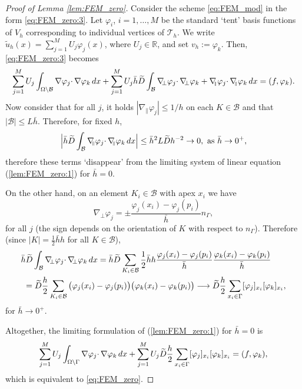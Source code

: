 \documentclass{article}
\theoremstyle{remark}
\def \IR {\mathbb{R}}
\def \Th {{\mathcal T}_h}
\def \d {{\rm d}}
\def\dx{\,\d x }
\def\B{\mathcal{B}}
\def\tu{\tilde{u}}
\def\gradn{\nabla_{\!\!\perp}}
\def\gradt{\nabla_{\!\!{\scriptscriptstyle\parallel}}}
\def\tD{\widetilde{D}}
\def\width{\bar{h}}
\begin{document}
\begin{proof}[Proof of Lemma \ref{lem:FEM_zero}]
Consider the scheme \eqref{eq:FEM_mod} in the form \eqref{eq:FEM_zero:3}. Let $\varphi_i$, $i=1,\ldots,M$ be the standard `tent' basis functions of $V_h$ corresponding to individual vertices of $\Th$. We write $\tu_h(x)=\sum_{j=1}^M U_j\varphi_j(x)$, where $U_j\in \IR$, and set $v_h:=\varphi_k$. Then, \eqref{eq:FEM_zero:3} becomes
\begin{equation}
\label{lem:FEM_zero:1}
\sum_{j=1}^M U_j\int_{\Omega\setminus\B} \nabla \varphi_j\cdotp\nabla \varphi_k \dx +\sum_{j=1}^M U_j\width\tD\int_{\B} \gradn \varphi_j \cdotp\gradn \varphi_k +\gradt \varphi_j\cdotp\gradt \varphi_k \dx=(f,\varphi_k).
\end{equation}
Now consider that for all $j$, it holds $|\gradt \varphi_j|\leq1/h$ on each $K\in\B$ and that $|\B|\leq L\width$. Therefore, for fixed $h$,
\begin{equation*}
\label{lem:FEM_zero:2}
\Big|\width\tD\int_{\B} \gradt \varphi_j\cdotp\gradt \varphi_k \dx\Big| \leq \width^2 L\tD h^{-2} \to 0,\text{ as }\width\to 0^+,
\end{equation*}
therefore these terms `disappear' from the limiting system of linear equation (\ref{lem:FEM_zero:1}) for $\width=0$.

On the other hand, on an element $K_i\in\B$ with apex $x_i$ we have
\begin{equation*}
\gradn \varphi_j=\pm\frac{\varphi_j(x_i)-\varphi_j(p_i)}{\width}n_\Gamma,
\end{equation*}
for all $j$ (the sign depends on the orientation of $K$ with respect to $n_\Gamma$). Therefore (since $|K|=\tfrac{1}{2}\width h$ for all $K\in\B$),
\begin{equation}
\nonumber
\label{lem:FEM_zero:3}
\begin{split}
&\width\tD\int_{\B} \gradn \varphi_j \cdotp\gradn \varphi_k \dx= \width\tD\sum_{K_i\in\B}\frac{1}{2}\width h \frac{\varphi_j(x_i)-\varphi_j(p_i)}{\width}
\frac{\varphi_k(x_i)-\varphi_k(p_i)}{\width}\\
&\ = \tD\frac{h}{2}\sum_{K_i\in\B} \big(\varphi_j(x_i)-\varphi_j(p_i)\big) \big(\varphi_k(x_i)-\varphi_k(p_i)\big)\longrightarrow \tD\frac{h}{2}\sum_{x_i\in\Gamma} [\varphi_j]_{x_i}[\varphi_k]_{x_i},
\end{split}
\end{equation}
for $\width\to 0^+$.

Altogether, the limiting formulation of (\ref{lem:FEM_zero:1}) for $\width=0$ is 
\begin{equation*}
\label{lem:FEM_zero:4}
\sum_{j=1}^M U_j\int_{\Omega\setminus\Gamma} \nabla \varphi_j\cdotp\nabla \varphi_k \dx +\sum_{j=1}^M U_j\tD\frac{h}{2} \sum_{x_i\in\Gamma} [\varphi_j]_{x_i}[\varphi_k]_{x_i} =(f,\varphi_k),
\end{equation*}
which is equivalent to \eqref{eq:FEM_zero}.

\end{proof}
\end{document}
